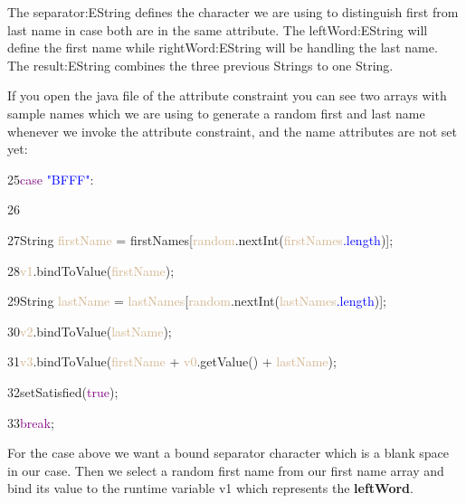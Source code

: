 The \textsf{separator:EString} defines the character we are using to distinguish first from last name in case both are in the same attribute. The \textsf{leftWord:EString} will define the first name while \textsf{rightWord:EString} will be handling the last name. The \textsf{result:EString} combines the three previous Strings to one String. \newline

\clearpage

If you open the java file of the attribute constraint you can see two arrays with sample names which we are using to generate a random first and last name whenever we invoke the attribute constraint, and the name attributes are not set yet:\newline

{

25\hspace{0.5cm}\textcolor{Purple}{case} \textcolor{Blue}{"BFFF"}:

26		  		

27\hspace{1cm}String \textcolor{Tan}{firstName} = firstNames[\textcolor{Tan}{random}.nextInt(\textcolor{Tan}{firstNames}\textcolor{Blue}{.length})];

28\hspace{1cm}\textcolor{Tan}{v1}.bindToValue(\textcolor{Tan}{firstName});

29\hspace{1cm}String \textcolor{Tan}{lastName} = \textcolor{Tan}{lastNames}[\textcolor{Tan}{random}.nextInt(\textcolor{Tan}{lastNames}\textcolor{Blue}{.length})];

30\hspace{1cm}\textcolor{Tan}{v2}.bindToValue(\textcolor{Tan}{lastName});

31\hspace{1cm}\textcolor{Tan}{v3}.bindToValue(\textcolor{Tan}{firstName} + \textcolor{Tan}{v0}.getValue() + \textcolor{Tan}{lastName});

32\hspace{1cm}setSatisfied(\textcolor{Purple}{true});	

33\hspace{1cm}\textcolor{Purple}{break}; \newline

}

For the case above we want a bound separator character which is a blank space in our case. Then we select a random first name from our first name array and bind its value to the runtime variable \textsf{v1} which represents the \textbf{leftWord}.

